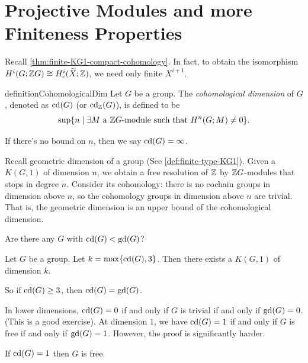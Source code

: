 \section{Projective Modules and more Finiteness Properties} 
\label{sec:L05-W02D2}

Recall \cref{thm:finite-KG1-compact-cohomology}. In fact, to obtain the isomorphism \(H^i(G;\mathbb{Z} G) \cong H_c^i(\widetilde X;\mathbb{Z})\), we need only finite \(X^{i+1}\).

\begin{restatable}{definition}{CohomologicalDim}
    \label{def:cohomological-dimension}
    Let \(G\) be a group. The \emph{cohomological dimension} of \(G\), denoted as \(\operatorname{cd}({G}) \) (or \(\operatorname{cd}_{\mathbb{Z}} (G)\)), is defined to be 
    \[
        \sup \{ n \mid \exists M \text{ a } \mathbb{Z} G \text{-module such that } H^n(G;M) \neq 0    \}.
    \]

    If there's no bound on \(n\), then we say \(\operatorname{cd}({G}) = \infty\).
\end{restatable}

Recall geometric dimension of a group (See \cref{def:finite-type-KG1}). Given a \(K(G,1)\) of dimension \(n\), we obtain a free resolution of \(\mathbb{Z}\) by \(\mathbb{Z} G\)-modules that stops in degree \(n\). Consider its cohomology: there is no cochain groups in dimension above \(n\), so the cohomology groups in dimension above \(n\) are trivial.  That is, the geometric dimension is an upper bound of the cohomological dimension.

\begin{question}
    Are there any \(G\) with \(\operatorname{cd}({G}) < \operatorname{gd}({G})\)?
\end{question}
\begin{theorem}
    \label{thm:cdG=gdG-for-cdG>3}
    Let \(G\) be a group. Let \(k = \max\{\operatorname{cd}({G }), 3\}\). Then there exists a \(K(G,1)\) of dimension \(k\).
\end{theorem}

So if \(\operatorname{cd}({G})\geq 3\), then \(\operatorname{cd}({G})=\operatorname{gd}({G})\). 

In lower dimensions, \(\operatorname{cd}({G}) =0\) if and only if \(G\) is trivial if and only if \(\operatorname{gd}({G}) =0\). (This is a good exercise). At dimension \(1\), we have \(\operatorname{cd}({G})=1\) if and only if \(G\) is free if and only if \(\operatorname{gd}({G}) =1\). However, the proof is significantly harder.

\begin{theorem}
    \label{thm:cdG=gdG-for-cdG=2}
    If \(\operatorname{cd}({G})=1\) then \(G\) is free.
\end{theorem}

